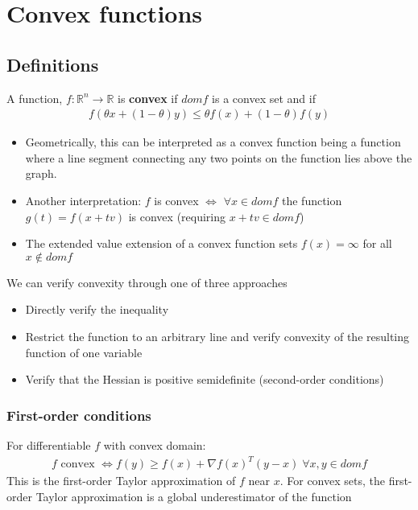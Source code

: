 \documentclass{article}
\begin{document}
\section{Convex functions}
\subsection{Definitions}
A function, $f: \mathbb{R}^n \rightarrow \mathbb{R}$ is \textbf{convex} if $dom f$ is a convex set and if
\begin{align*}
  f(\theta x + (1-\theta)y) \leq \theta f(x) + (1-\theta)f(y)
\end{align*}
\begin{itemize}
  \item Geometrically, this can be interpreted as a convex function being a function where a line segment connecting any two points on the function lies above the graph.
  \item Another interpretation: $f$ is convex $\Longleftrightarrow$ $\forall x \in dom f$ the function $g(t) = f(x + tv)$ is convex (requiring $x + tv \in dom f$)
  \item The extended value extension of a convex function sets $f(x) = \infty$ for all $x \notin dom f$
\end{itemize}
We can verify convexity through one of three approaches
\begin{itemize}
  \item Directly verify the inequality
  \item Restrict the function to an arbitrary line and verify convexity of the resulting function of one variable
  \item Verify that the Hessian is positive semidefinite (second-order conditions)
\end{itemize}
\subsubsection{First-order conditions}
For differentiable $f$ with convex domain:
\begin{align*}
  \textrm{$f$ convex } \Longleftrightarrow f(y) \geq f(x) + \nabla f(x)^T(y-x) \; \forall x,y \in dom f
\end{align*}
This is the first-order Taylor approximation of $f$ near $x$. For convex sets, the first-order Taylor approximation is a global underestimator of the function
\end{document}
